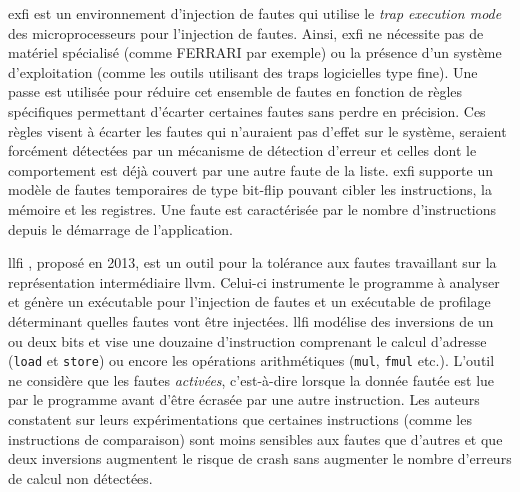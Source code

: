                 \gls{exfi} \cite{Benso/TODAES98} est un environnement d'injection de fautes qui utilise le \textit{trap execution mode} des microprocesseurs pour l'injection de fautes.
                Ainsi, \gls{exfi} ne nécessite pas de matériel spécialisé (comme FERRARI \cite{Kanawati/FTCS92} par exemple) ou la présence d'un système d'exploitation (comme les outils utilisant des traps logicielles type \gls{fine}).
                Une passe est utilisée pour réduire cet ensemble de fautes en fonction de règles spécifiques permettant d'écarter certaines fautes sans perdre en précision. 
                Ces règles visent à écarter les fautes qui n'auraient pas d'effet sur le système, seraient forcément détectées par un mécanisme de détection d'erreur et celles dont le comportement est déjà couvert par une autre faute de la liste.
                \gls{exfi} supporte un modèle de fautes temporaires de type bit-flip pouvant cibler les instructions, la mémoire et les registres.
                Une faute est caractérisée par le nombre d'instructions depuis le démarrage de l'application.
                
                \gls{llfi} \cite{Thomas/SELSE13, Lu/SQRS15}, proposé en 2013, est un outil pour la tolérance aux fautes travaillant sur la représentation intermédiaire \gls{llvm}.
                Celui-ci instrumente le programme à analyser et génère un exécutable pour l'injection de fautes et un exécutable de profilage déterminant quelles fautes vont être injectées.
                \gls{llfi} modélise des inversions de un ou deux bits et vise une douzaine d'instruction comprenant le calcul d'adresse (\texttt{load} et \texttt{store}) ou encore les opérations arithmétiques (\texttt{mul}, \texttt{fmul} etc.).
                L'outil ne considère que les fautes \textit{activées}, c'est-à-dire lorsque la donnée fautée est lue par le programme avant d'être écrasée par une autre instruction.
                Les auteurs constatent sur leurs expérimentations que certaines instructions (comme les instructions de comparaison)
                sont moins sensibles aux fautes que d'autres et que deux inversions augmentent le risque de crash sans augmenter le nombre d'erreurs de calcul non détectées.
    
